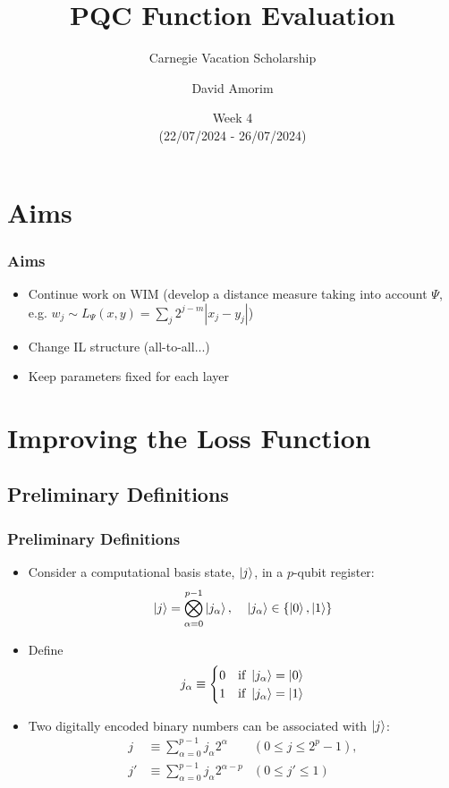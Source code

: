 \documentclass{beamer}
\title[PQC Function Evaluation]{PQC Function Evaluation}
\subtitle{Carnegie Vacation Scholarship}
\author[David Amorim]{David Amorim}
\institute[]{}
\date[29/07/2024]{Week 4 \\(22/07/2024 - 26/07/2024)}
\begin{document}
\frame{\titlepage}

\section{Aims}

\begin{frame}
\frametitle{Aims}
\begin{itemize}
\item Continue work on WIM (develop a distance measure taking into account $\Psi$, e.g. $w_j \sim L_\Psi (x,y)=\sum_j 2^{j-m} |x_j -y_j|$) 
\item Change IL structure (all-to-all...)
\item Keep parameters fixed for each layer
\end{itemize}
\end{frame}

\section{Improving the Loss Function}

\subsection{Preliminary Definitions}

\begin{frame}
\frametitle{Preliminary Definitions}
\begin{itemize}
\item Consider a \alert{computational basis state}, $\ket{j}$, in a $p$-qubit register:
\begin{equation}
\ket{j} = \bigotimes^{p-1}_{\alpha=0} \ket{j_\alpha}, \; \; \; \; \ket{j_\alpha} \in \{\ket{0},\ket{1} \}
\end{equation}
\item Define 
\begin{equation}
j_\alpha \equiv \begin{cases}
0 & \text{if } \ket{j_\alpha}=\ket{0} \\
1 & \text{if }  \ket{j_\alpha}=\ket{1} \\
\end{cases}
\end{equation}
\item Two \alert{digitally encoded binary numbers} can be associated with $\ket{j}$:
\begin{align}
j &\equiv \sum_{\alpha=0}^{p-1} j_\alpha 2^{\alpha} &(0 \leq j \leq 2^p-1 ), \\
j' &\equiv \sum_{\alpha=0}^{p-1} j_\alpha 2^{\alpha-p} &(0 \leq j' \leq 1)
\end{align}
\end{itemize}
\end{frame}
\end{document}
